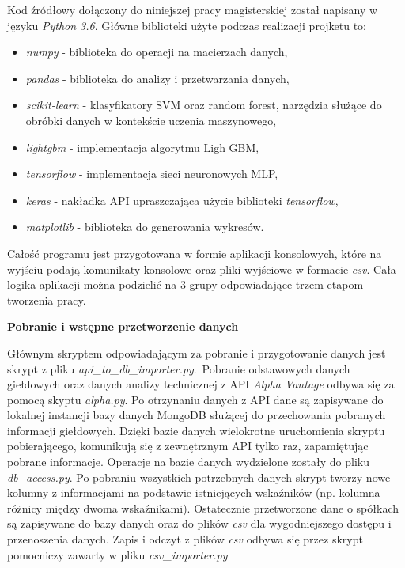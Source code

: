 \documentclass[a4paper, twoside, 11pt, openright]{article}
\begin{document}
Kod źródłowy dołączony do niniejszej pracy magisterskiej został napisany w języku \textit{Python 3.6}. Główne biblioteki użyte podczas realizacji projketu to:
\begin{itemize}
    \item \textit{numpy} - biblioteka do operacji na macierzach danych,
    \item \textit{pandas} - biblioteka do analizy i przetwarzania danych,
    \item \textit{scikit-learn} - klasyfikatory SVM oraz random forest, narzędzia służące do obróbki danych w kontekście uczenia maszynowego,
    \item \textit{lightgbm} - implementacja algorytmu Ligh GBM,
    \item \textit{tensorflow} - implementacja sieci neuronowych MLP,
    \item \textit{keras} - nakładka API upraszczająca użycie biblioteki \textit{tensorflow},
    \item \textit{matplotlib} - biblioteka do generowania wykresów.
\end{itemize}

Całość programu jest przygotowana w formie aplikacji konsolowych, które na wyjściu podają komunikaty konsolowe oraz pliki wyjściowe w formacie \textit{csv}. Cała logika aplikacji można podzielić na 3 grupy odpowiadające trzem etapom tworzenia pracy.

\bigskip

\textbf{Pobranie i wstępne przetworzenie danych}

Głównym skryptem odpowiadającym za pobranie i przygotowanie danych jest skrypt z pliku \textit{api\_to\_db\_importer.py}.~Pobranie odstawowych danych giełdowych oraz danych analizy technicznej z API \textit{Alpha Vantage} \cite{alphavantage} odbywa się za pomocą skyptu \textit{alpha.py}. Po otrzynaniu danych z API dane są zapisywane do lokalnej instancji bazy danych MongoDB służącej do przechowania pobranych informacji giełdowych. Dzięki bazie danych wielokrotne uruchomienia skryptu pobierającego, komunikują się z zewnętrznym API tylko raz, zapamiętując pobrane informacje. Operacje na bazie danych wydzielone zostały do pliku \textit{db\_access.py}. Po pobraniu wszystkich potrzebnych danych skrypt tworzy nowe kolumny z informacjami na podstawie istniejących wskaźników (np. kolumna różnicy między dwoma wskaźnikami). Ostatecznie przetworzone dane o spółkach są zapisywane do bazy danych oraz do plików \textit{csv} dla wygodniejszego dostępu i przenoszenia danych. Zapis i odczyt z plików \textit{csv} odbywa się przez skrypt pomocniczy zawarty w pliku \textit{csv\_importer.py}
\end{document}
